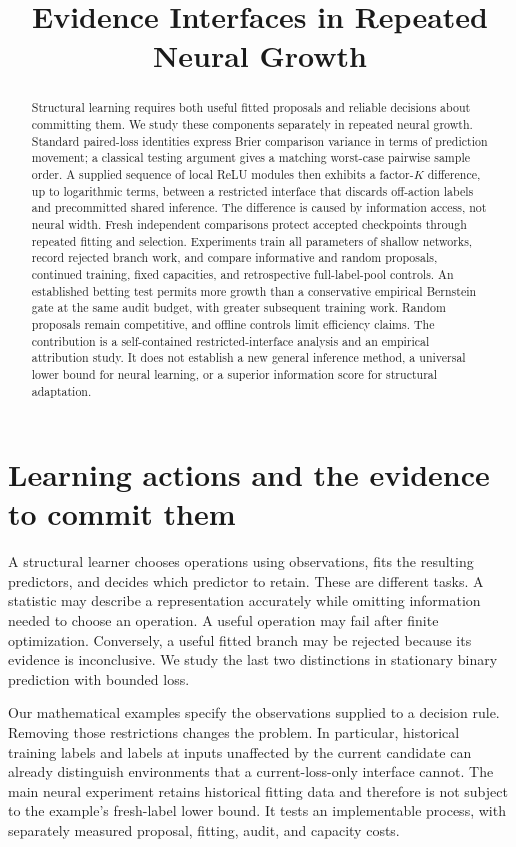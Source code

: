 \documentclass[11pt]{article}
\title{Evidence Interfaces in Repeated Neural Growth}
\theoremstyle{remark}\newtheorem{remark}[theorem]{Remark}
\begin{document}
\maketitle
\begin{abstract}
Structural learning requires both useful fitted proposals and reliable decisions
about committing them. We study these components separately in repeated neural
growth. Standard paired-loss identities express Brier comparison variance in
terms of prediction movement; a classical testing argument gives a matching
worst-case pairwise sample order. A supplied sequence of local ReLU modules
then exhibits a factor-$K$ difference, up to logarithmic terms, between a
restricted interface that discards off-action labels and precommitted shared
inference. The difference is caused by information access, not neural width.
Fresh independent comparisons protect accepted checkpoints through repeated
fitting and selection. Experiments train all parameters of shallow networks,
record rejected branch work, and compare informative and random proposals,
continued training, fixed capacities, and retrospective full-label-pool controls.
An established betting test permits more growth than a conservative empirical
Bernstein gate at the same audit budget, with greater subsequent training work.
Random proposals remain competitive, and offline controls limit efficiency
claims. The contribution is a self-contained restricted-interface analysis and
an empirical attribution study. It does not establish a new general inference
method, a universal lower bound for neural learning, or a superior information
score for structural adaptation.
\end{abstract}
\tableofcontents

\section{Learning actions and the evidence to commit them}
A structural learner chooses operations using observations, fits the resulting
predictors, and decides which predictor to retain. These are different tasks.
A statistic may describe a representation accurately while omitting information
needed to choose an operation. A useful operation may fail after finite
optimization. Conversely, a useful fitted branch may be rejected because its
evidence is inconclusive. We study the last two distinctions in stationary
binary prediction with bounded loss.

Our mathematical examples specify the observations supplied to a decision
rule. Removing those restrictions changes the problem. In particular, historical
training labels and labels at inputs unaffected by the current candidate can
already distinguish environments that a current-loss-only interface cannot.
The main neural experiment retains historical fitting data and therefore is
not subject to the example's fresh-label lower bound. It tests an implementable
process, with separately measured proposal, fitting, audit, and capacity costs.
\end{document}

